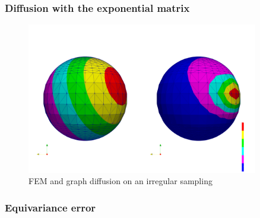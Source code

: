 \subsubsection{Diffusion with the exponential matrix}


\begin{figure}[h]
	\label{fig:FEM lumped symmetric diffusion on equiangular sampling}
	\centering
	\includegraphics[width=0.9\textwidth]{figs/Chapter3/diffusion.png}
	\caption{FEM and graph diffusion on an irregular sampling}
\end{figure}

\subsubsection{Equivariance error}





